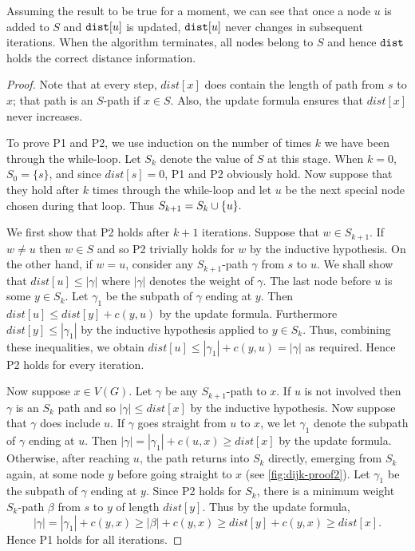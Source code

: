 \begin{note} Assuming the result to be true for a moment, we can see
that once a node $u$ is added to $S$ and $\dist[u]$ is updated, $\dist[u]$
never changes in subsequent iterations. When the algorithm terminates,
all nodes belong to $S$ and hence $\dist$ holds the correct distance information.
\end{note}
\begin{proof} 
Note that at every step, $dist[x]$ does contain
the length of  path from $s$ to $x$; that path is an
$S$-path if $x\in S$. Also, the update formula ensures that $dist[x]$
never increases. 

To prove P1 and P2, we use induction on the number of times $k$ we
have been through the while-loop. Let $S_k$ denote the value of $S$
at this stage. When $k=0$, $S_0=\{s\}$, and since $dist[s]=0$, P1 and
P2 obviously hold. Now suppose that they hold after $k$ times through
the while-loop and let $u$ be the next special node chosen during that
loop. Thus $S_{k+1} = S_k \cup \mbox{$\{u\}$}.$

We first show that P2 holds after $k+1$ iterations. Suppose that
$w\in S_{k+1}$.  If $w\neq u$ then $w\in S$ and so P2 trivially
holds for $w$ by the inductive hypothesis. On the other hand,
if $w=u$, consider any $S_{k+1}$-path $\gamma$ from $s$ to $u$.
We shall show that $dist[u] \leq
|\gamma |$ where $| \gamma | $ denotes the weight of $\gamma$. The
last node before $u$ is some $y\in S_k$. Let $\gamma_1$ be the subpath
of $\gamma$ ending at $y$. Then $dist[u] \leq dist[y] + c(y,u)$ by the
update formula. Furthermore $dist[y] \leq |\gamma_1 |$ by the inductive
hypothesis applied to $y\in S_k$. Thus, combining these inequalities,
we obtain $dist[u] \leq |\gamma_1 | + c(y, u) = | \gamma |$ as
required. Hence P2 holds for every iteration.

Now suppose $x\in V(G)$. Let $\gamma$ be any $S_{k+1}$-path to $x$. If
$u$ is not involved then $\gamma$ is an $S_k$ path and so $|\gamma| \leq
dist[x]$ by the inductive hypothesis. Now suppose that $\gamma$ does
include $u$. 
If $\gamma$ goes straight from $u$ to $x$, we let $\gamma_1$ denote the 
subpath of $\gamma$ ending at $u$. Then $|\gamma| = |\gamma_1| + c(u,x) \geq 
dist[x]$ by the update formula. 
Otherwise, after reaching $u$, the path returns into $S_k$
directly, emerging from $S_k$ again, at some node $y$ before going
straight to $x$ (see \cref{fig:dijk-proof2}). Let $\gamma_1$
be the subpath of $\gamma$ ending at $y$. Since P2 holds for $S_k$,
there is a minimum weight $S_k$-path $\beta$ from $s$ to $y$ of length
$dist[y]$. Thus by the update formula, 
$$
|\gamma| = |\gamma_1| + c(y,
x) \geq |\beta| + c(y, x) \geq dist[y] + c(y, x) \geq dist[x].
$$ 
Hence P1 holds for all iterations.
\end{proof}

